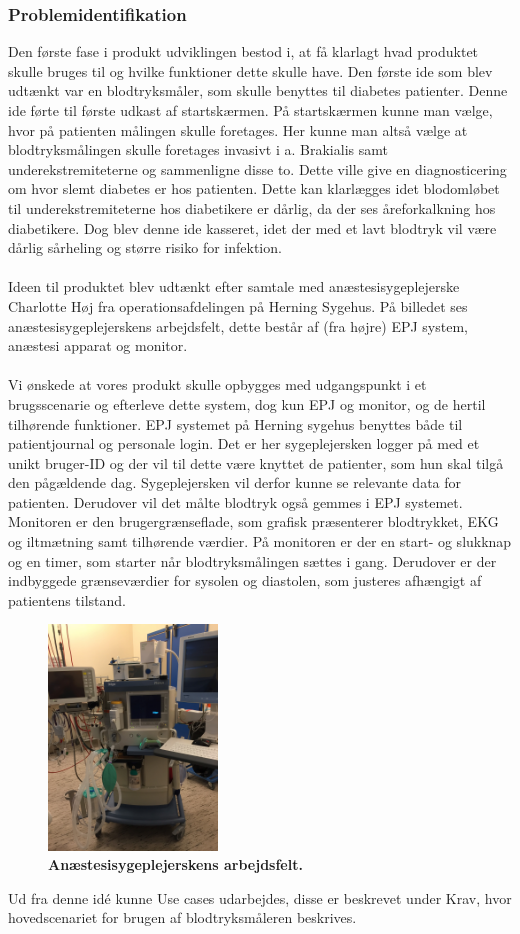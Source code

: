 \subsubsection{Problemidentifikation}
Den første fase i produkt udviklingen bestod i, at få klarlagt hvad produktet skulle bruges til og hvilke funktioner dette skulle have. Den første ide som blev udtænkt var en blodtryksmåler, som skulle benyttes til diabetes patienter. Denne ide førte til første udkast af startskærmen. På startskærmen kunne man vælge, hvor på patienten målingen skulle foretages. Her kunne man altså vælge at blodtryksmålingen skulle foretages invasivt i a. Brakialis samt underekstremiteterne og sammenligne disse to. Dette ville give en diagnosticering om hvor slemt diabetes er hos patienten. Dette kan klarlægges idet blodomløbet til underekstremiteterne hos diabetikere er dårlig, da der ses åreforkalkning hos diabetikere. Dog blev denne ide kasseret, idet der med et lavt blodtryk vil være dårlig sårheling og større risiko for infektion.\\\\
Ideen til produktet blev udtænkt efter samtale med anæstesisygeplejerske Charlotte Høj fra operationsafdelingen på Herning Sygehus. På billedet ses anæstesisygeplejerskens arbejdsfelt, dette består af (fra højre) EPJ system, anæstesi apparat og monitor.\\\\
Vi ønskede at vores produkt skulle opbygges med udgangspunkt i et brugsscenarie og efterleve dette system, dog kun EPJ og monitor, og de hertil tilhørende funktioner. EPJ systemet på Herning sygehus benyttes både til patientjournal og personale login. Det er her sygeplejersken logger på med et unikt bruger-ID og der vil til dette være knyttet de patienter, som hun skal tilgå den pågældende dag. Sygeplejersken vil derfor kunne se relevante data for patienten. Derudover vil det målte blodtryk også gemmes i EPJ systemet. Monitoren er den brugergrænseflade, som grafisk præsenterer blodtrykket, EKG og iltmætning samt tilhørende værdier. På monitoren er der en start- og slukknap og en timer, som starter når blodtryksmålingen sættes i gang. Derudover er der indbyggede grænseværdier for sysolen og diastolen, som justeres afhængigt af patientens tilstand. 
\begin{figure}[H]
\includegraphics[width =0.4\textwidth , center]{billeder/anastesi}
\caption{\textbf{Anæstesisygeplejerskens arbejdsfelt.}}
\end{figure}
Ud fra denne idé kunne Use cases udarbejdes, disse er beskrevet under Krav, hvor hovedscenariet for brugen af blodtryksmåleren beskrives.
